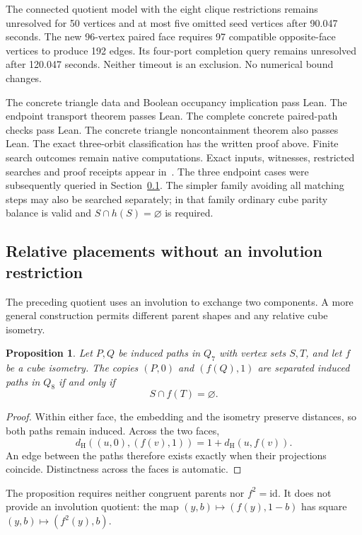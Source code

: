 \documentclass[11pt,a4paper]{article}
\newtheorem{proposition}[theorem]{Proposition}
\theoremstyle{definition}
\theoremstyle{remark}
\newcommand{\Ham}{d_{\mathrm H}}
\begin{document}
The connected quotient model with the eight clique restrictions remains
unresolved for 50 vertices and at most five omitted seed vertices after
90.047 seconds. The new 96-vertex paired face requires 97 compatible
opposite-face vertices to produce 192 edges. Its four-port completion
query remains unresolved after 120.047 seconds. Neither timeout is an
exclusion. No numerical bound changes.

The concrete triangle data and Boolean occupancy implication pass Lean. The endpoint transport theorem passes Lean. The complete concrete paired-path checks pass Lean. The concrete triangle noncontainment theorem also passes Lean. The exact three-orbit classification has the written proof above. Finite search outcomes remain native computations.
Exact inputs, witnesses, restricted searches and proof receipts appear
in~\cite{symmetry198archive}. The three endpoint cases were subsequently
queried in Section~\ref{sec:symmetry199}. The simpler family avoiding all matching
steps may also be searched separately; in that family ordinary cube
parity balance is valid and $S\cap h(S)=\varnothing$ is required.


\subsection{Relative placements without an involution restriction}
\label{sec:symmetry199}

The preceding quotient uses an involution to exchange two components.
A more general construction permits different parent shapes and any
relative cube isometry.

\begin{proposition}
Let $P,Q$ be induced paths in $Q_7$ with vertex sets $S,T$, and let
$f$ be a cube isometry. The copies $(P,0)$ and $(f(Q),1)$ are separated
induced paths in $Q_8$ if and only if
\[
S\cap f(T)=\varnothing.
\]
\end{proposition}
\begin{proof}
Within either face, the embedding and the isometry preserve distances,
so both paths remain induced. Across the two faces,
\[
\Ham((u,0),(f(v),1))=1+\Ham(u,f(v)).
\]
An edge between the paths therefore exists exactly when their projections
coincide. Distinctness across the faces is automatic.
\end{proof}
The proposition requires neither congruent parents nor $f^2=\mathrm{id}$.
It does not provide an involution quotient: the map
$(y,b)\mapsto(f(y),1-b)$ has square $(y,b)\mapsto(f^2(y),b)$.
\end{document}
